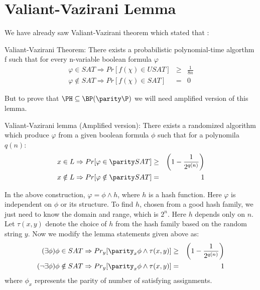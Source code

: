 \documentclass[11pt]{article}
\begin{document}
  
\section{Valiant-Vazirani Lemma}
We have already saw Valiant-Vazirani theorem which stated that :
\begin{lemma} Valiant-Vazirani Theorem: There exists a probabilistic
polynomial-time algorthm f such that for every n-variable boolean
formula $\varphi$
\begin{eqnarray*}
  \varphi\in SAT\Rightarrow Pr[f(\chi)\in USAT] &\geq& \frac{1}{8n} \\
  \varphi\notin SAT\Rightarrow Pr[f(\chi)\in SAT] &=& 0
\end{eqnarray*}
\end{lemma}
But to prove that $\PH \subseteq \BP(\parity\P)$ we will need
amplified version of this lemma.
\begin{lemma}
Valiant-Vazirani lemma (Amplified version): There exists a randomized
algorithm which produce $\varphi$ from a given boolean formula $\phi$
such that for a polynomila $q(n)$:
\begin{eqnarray*}
  x\in L \Rightarrow Pr[\varphi\in \parity SAT] &\geq&
  \left(1-\frac{1}{2^{q(n)}}\right) \\ 
  x\notin L \Rightarrow Pr[\varphi\notin \parity SAT] &=& 1
\end{eqnarray*}
\end{lemma} In the above construction, $\varphi=\phi\land h$, where
$h$ is a hash function. Here $\varphi$ is independent on $\phi$ or its
structure.  To find $h$, chosen from a good hash family, we just need
to know the domain and range, which is $2^n$. Here $h$ depends only on
$n$. Let $\tau(x,y)$ denote the choice of $h$ from the hash family
based on the random string $y$.  Now we modify the lemma statements
given above as:
\begin{eqnarray*}
  (\exists \phi) \phi\in  SAT\Rightarrow
  Pr_y[\displaystyle\parity_x\phi\land\tau(x,y)] &\geq&
  \left(1-\frac{1}{2^{q(n)}}\right) \\
  (\lnot\exists \phi) \phi\notin  SAT\Rightarrow
  Pr_y[\displaystyle\parity_x\phi\land\tau(x,y)] &=& 1
\end{eqnarray*}
where $\displaystyle\phi_x$ represents the parity of number of
satisfying assignments.
\end{document}
